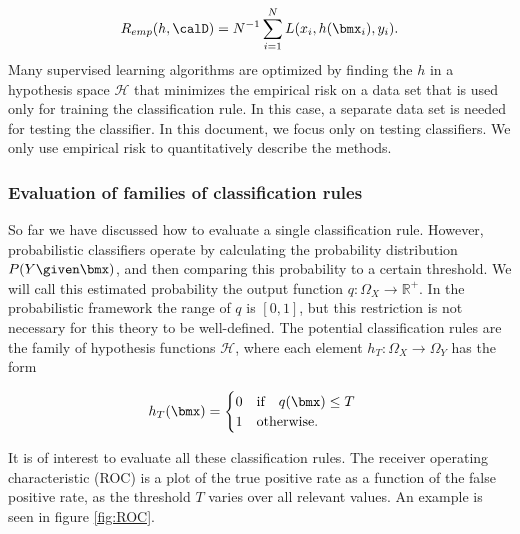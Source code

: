 \begin{equation}
\label{def:empRisk}
R_{emp}(h, \calD) = N^{-1} \sum_{i=1}^N L(x_i, h(\bmx_i), y_i).
\end{equation}
Many supervised learning algorithms are optimized by finding the $h$ in a hypothesis space $\mathcal{H}$ that minimizes the empirical risk on a data set that is used only for training the classification rule.  In this case, a separate data set is needed for testing the classifier.  In this document, we focus only on testing classifiers.  We only use empirical risk to quantitatively describe the methods.

\subsubsection{Evaluation of families of classification rules}
\label{sec:hypothesisSpace}

So far we have discussed how to evaluate a single classification rule.  
However, probabilistic classifiers operate by calculating the probability distribution $P(Y\given\bmx)$, and then comparing this probability to a certain threshold.  
We will call this estimated probability the output function $q: \Omega_X \rightarrow \mathbb{R}^+$.  In the probabilistic framework the range of $q$ is $[0, 1]$, but this restriction is not necessary for this theory to be well-defined.  
The potential classification rules are the family of hypothesis functions $\mathcal{H}$, where each element $h_T:\Omega_X \rightarrow \Omega_Y$ has the form 

\begin{equation}
\label{eq:ht}
h_T(\bmx) = 
\begin{cases}
0 \quad \mbox{if} \quad q(\bmx) \leq T\\
1 \quad \mbox{otherwise.}
\end{cases}
\end{equation}

It is of interest to evaluate all these classification rules.  The receiver operating characteristic (ROC) is a plot of the true positive rate as a function of the false positive rate, as the threshold $T$ varies over all relevant values.  An example is seen in figure \ref{fig:ROC}.

